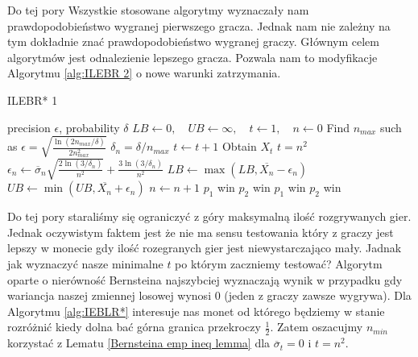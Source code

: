 \documentclass[inzynierska]{pwr_wmat_praca_dyplomowa}
\theoremstyle{plain}
\numberwithin{theorem}{chapter}
\theoremstyle{definition}
\numberwithin{theorem}{chapter}
\begin{document}
	Do tej pory Wszystkie stosowane algorytmy wyznaczały nam prawdopodobieństwo wygranej pierwszego gracza. Jednak nam nie zależny na tym dokładnie znać prawdopodobieństwo wygranej graczy. Głównym celem algorytmów jest odnalezienie lepszego gracza. Pozwala nam to modyfikacje Algorytmu \ref{alg:ILEBR 2} o nowe warunki zatrzymania.
	\begin{algorithm}[H]\captionsetup{labelformat=custom2}
		\caption{ILEBR* 1}\label{alg:IEBLR* 1}
		\begin{algorithmic}
			\Ensure precision $\epsilon$, probability $\delta$ 
			\State  $ LB \gets 0,\quad UB \gets \infty,\quad t \gets 1,\quad n \gets 0 $
			\State Find $n_{max}$ such as $		\epsilon =  \sqrt{\frac{\ln(2n_{max}/\delta)}{2n_{max}^2}} $
			\Statex $\delta_n = \delta/n_{max}$
			\Repeat 
			\State $t \gets t + 1$
			\State Obtain $X_t$
			\Until $t=n^2$
			\State $\epsilon_n \gets \overline{\sigma}_n \sqrt{\frac{2\ln(3/\delta_n)}{n^2}} + \frac{3  \ln{(3 / \delta_n)}}{n^2}$ 
			\State $LB \gets \max(LB,  \overline{X_n} - \epsilon_n)$
			\State $UB \gets \min(UB,  \overline{X_n} + \epsilon_n)$
			\State $n \gets n + 1$
			\EndWhile
			\State \Return $p_1$ win
			\State \Return $p_2$ win
			\State \Return $p_1$ win
			\Else
			\State \Return $p_2$ win
			\EndIf
		\end{algorithmic}
	\end{algorithm}
	Do tej pory staraliśmy się ograniczyć z góry maksymalną ilość rozgrywanych gier. Jednak oczywistym faktem jest że nie ma sensu testowania który z graczy jest lepszy w monecie gdy ilość rozegranych gier jest niewystarczająco mały. Jadnak jak wyznaczyć nasze minimalne $t$ po którym zaczniemy testować? Algorytm oparte o nierówność Bernsteina najszybciej wyznaczają wynik w przypadku gdy wariancja naszej zmiennej losowej wynosi 0 (jeden z graczy zawsze wygrywa). Dla Algorytmu \ref{alg:IEBLR*} interesuje nas monet od którego będziemy w stanie rozróżnić kiedy dolna bać górna granica przekroczy $\frac{1}{2}$. Zatem oszacujmy $n_{min}$ korzystać z Lematu \ref{Bernsteina emp ineq lemma} dla $\overline{\sigma}_t=0$ i $t = n^2$.  
	
	
	
\end{document}
